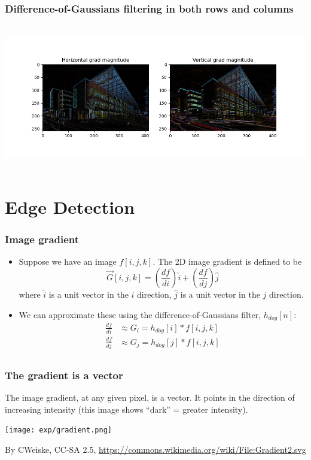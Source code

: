 \documentclass{beamer}
\begin{document}
\begin{frame}
  \frametitle{Difference-of-Gaussians filtering in both rows and columns}
      
  \centerline{\includegraphics[height=2.5in]{mp3fig8.png}}
\end{frame}

\section[Edges]{Edge Detection}
\setcounter{subsection}{1}

\begin{frame}
  \frametitle{Image gradient}
  \begin{itemize}
  \item Suppose we have an image $f[i,j,k]$.  The 2D image gradient is
    defined to be
    \[
    \vec{G}[i,j,k] = \left(\frac{df}{di}\right)\hat{i} + \left(\frac{df}{dj}\right)\hat{j}
    \]
    where $\hat{i}$ is a unit vector in the $i$ direction, $\hat{j}$
    is a unit vector in the $j$ direction.
  \item We can approximate these using the difference-of-Gaussians filter, $h_{dog}[n]$:
    \begin{align*}
      \frac{df}{di} &\approx G_i = h_{dog}[i]\ast f[i,j,k]\\
      \frac{df}{dj} &\approx G_j = h_{dog}[j]\ast f[i,j,k]\\
    \end{align*}
  \end{itemize}
\end{frame}
\begin{frame}
  \frametitle{The gradient is a vector}
  The image gradient, at any given pixel, is a vector.  It  points in the direction of
  increasing intensity (this image shows ``dark'' = greater intensity).
  \centerline{\texttt{[image: exp/gradient.png]}}
  \begin{tiny}
    By CWeiske, CC-SA 2.5,
    \url{https://commons.wikimedia.org/wiki/File:Gradient2.svg}
  \end{tiny}
\end{frame}
      
\end{document}
